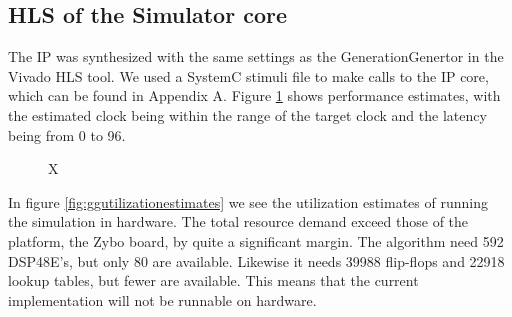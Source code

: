 \subsection{HLS of the Simulator core}

The IP was synthesized with the same settings as the GenerationGenertor in the Vivado HLS tool. We used a SystemC stimuli file to make calls to the IP core, which can be found in Appendix A. Figure \ref{fig:simperformanceestimates} shows performance estimates, with the estimated clock being within the range of the target clock and the latency being from  0 to 96. 

\begin{figure}[htbp]
	\centering
	\caption{X}
	\label{fig:simperformanceestimates}
\end{figure}

In figure \ref{fig:ggutilizationestimates} we see the utilization estimates of running the simulation in hardware. The total resource demand exceed those of the platform, the Zybo board, by quite a significant margin. The algorithm need 592 DSP48E's, but only 80 are available. Likewise it needs 39988 flip-flops and 22918 lookup tables, but fewer are available. This means that the current implementation will not be runnable on hardware.

